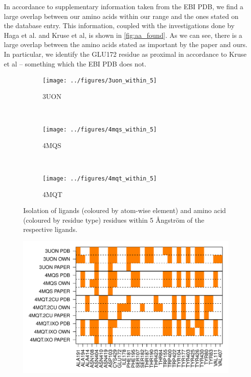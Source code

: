 \documentclass[10pt]{article}\usepackage[]{graphicx}\usepackage[]{color}
\makeatletter
\def\maxwidth{ %
  \ifdim\Gin@nat@width>\linewidth
    \linewidth
  \else
    \Gin@nat@width
  \fi
}
\theoremstyle{plain}
\makeatother
\begin{document}
\begin{multicols*}{2}
In accordance to supplementary information taken from the EBI PDB, we find a large overlap between our amino acids within our range and the ones stated on the database entry. This information, coupled with the investigations done by Haga et al. and Kruse et al, is shown in \cref{fig:aa_found}. As we can see, there is a large overlap between the amino acids stated as important by the paper and ours. In particular, we identify the GLU172 residue as proximal in accordance to Kruse et al -- something which the EBI PDB does not.

  \begin{figure}[H]
    \centering
    \begin{subfigure}[H]{.33\textwidth}
      \texttt{[image: ../figures/3uon\_within\_5]}
      \caption{3UON}
    \end{subfigure}\\
    \begin{subfigure}[H]{.33\textwidth}
      \texttt{[image: ../figures/4mqs\_within\_5]}
      \caption{4MQS}
    \end{subfigure}\\
    \begin{subfigure}[H]{.33\textwidth}
      \texttt{[image: ../figures/4mqt\_within\_5]}
      \caption{4MQT}
    \end{subfigure}%
    \caption{Isolation of ligands (coloured by atom-wise element) and amino acid (coloured by residue type) residues within 5 Ångström of the respective ligands.}
    \label{fig:within_5}
  \end{figure}

\begin{Schunk}
\begin{figure}[H]

{\centering \includegraphics[width=\maxwidth]{figure/twocolumn-aa_found-1} 

}
\end{figure}
\end{Schunk}
\end{multicols*}
\end{document}
